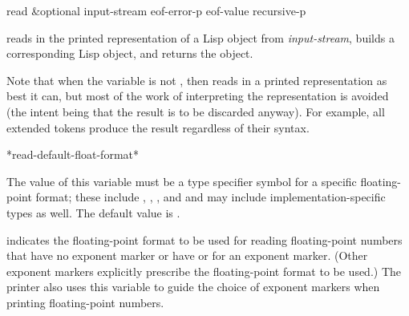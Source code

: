 \begin{defun}[Function]
read &optional input-stream eof-error-p eof-value recursive-p

 reads in the printed representation of a Lisp object
from \emph{input-stream}, builds a corresponding Lisp object, and returns
the object.

Note that when the variable  is not {\nil},
then  reads in a printed representation as best it can,
but most of the work of interpreting the representation is avoided
(the intent being that the result is to be discarded anyway).
For example, all extended tokens produce the result {\nil} regardless
of their syntax.
\end{defun}

\begin{defun}[Variable]
*read-default-float-format*

The value of this variable must be a type specifier symbol for
a specific floating-point format; these include
, ,
, and  and may include implementation-specific
types as well.  The default value is .

indicates the floating-point format to be used
for reading floating-point numbers that have no exponent marker or have
 or  for an exponent marker.  (Other exponent markers
explicitly prescribe the floating-point format to be used.)
The printer also uses this variable to guide the choice of exponent
markers when printing floating-point numbers.
\end{defun}

